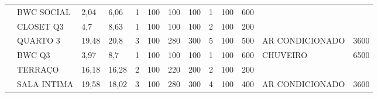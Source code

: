\begin{table}[H]
{\begin{tabular}{|l|l|ll|llll|lll|ll|}
		& BWC SOCIAL                   & \multicolumn{1}{l|}{2,04}                   & 6,06                   & \multicolumn{1}{l|}{1}                  & \multicolumn{1}{l|}{100}                  & \multicolumn{1}{l|}{100}                  & 100                  & \multicolumn{1}{l|}{1}                  & \multicolumn{1}{l|}{100}                  & 600                   & \multicolumn{1}{l|}{}                     &          \\ \cline{2-13} 
		& CLOSET Q3                    & \multicolumn{1}{l|}{4,7}                    & 8,63                   & \multicolumn{1}{l|}{1}                  & \multicolumn{1}{l|}{100}                  & \multicolumn{1}{l|}{100}                  & 100                  & \multicolumn{1}{l|}{2}                  & \multicolumn{1}{l|}{100}                  & 200                   & \multicolumn{1}{l|}{}                     &          \\ \cline{2-13} 
		& QUARTO 3                     & \multicolumn{1}{l|}{19,48}                  & 20,8                   & \multicolumn{1}{l|}{3}                  & \multicolumn{1}{l|}{100}                  & \multicolumn{1}{l|}{280}                  & 300                  & \multicolumn{1}{l|}{5}                  & \multicolumn{1}{l|}{100}                  & 500                   & \multicolumn{1}{l|}{AR CONDICIONADO}      & 3600     \\ \cline{2-13} 
		& BWC Q3                       & \multicolumn{1}{l|}{3,97}                   & 8,7                    & \multicolumn{1}{l|}{1}                  & \multicolumn{1}{l|}{100}                  & \multicolumn{1}{l|}{100}                  & 100                  & \multicolumn{1}{l|}{1}                  & \multicolumn{1}{l|}{100}                  & 600                   & \multicolumn{1}{l|}{CHUVEIRO}             & 6500     \\ \cline{2-13} 
		& TERRAÇO                      & \multicolumn{1}{l|}{16,18}                  & 16,28                  & \multicolumn{1}{l|}{2}                  & \multicolumn{1}{l|}{100}                  & \multicolumn{1}{l|}{220}                  & 200                  & \multicolumn{1}{l|}{2}                  & \multicolumn{1}{l|}{100}                  & 200                   & \multicolumn{1}{l|}{}                     &          \\ \cline{2-13} 
		& SALA INTIMA                  & \multicolumn{1}{l|}{19,58}                  & 18,02                  & \multicolumn{1}{l|}{3}                  & \multicolumn{1}{l|}{100}                  & \multicolumn{1}{l|}{280}                  & 300                  & \multicolumn{1}{l|}{4}                  & \multicolumn{1}{l|}{100}                  & 400                   & \multicolumn{1}{l|}{AR CONDICIONADO}      & 3600     \\ \cline{2-13} 

\end{tabular}}
\end{table}
